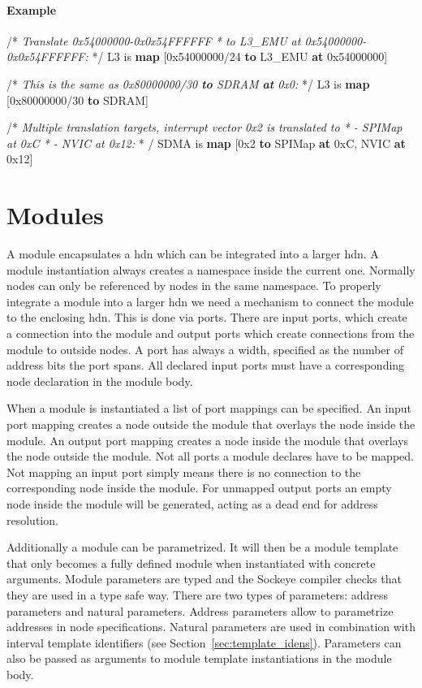 \documentclass[a4paper,11pt,twoside]{report}
\begin{document}
{{{\paragraph{Example}
\begin{example}
    /* \textit{Translate \textup{0x54000000-0x0x54FFFFFF}
     * to \textup{L3_EMU} at \textup{0x54000000-0x0x54FFFFFF}:}
     */
    L3 is \textbf{map} [0x54000000/24 \textbf{to} L3_EMU \textbf{at} 0x54000000] 

    /* \textit{This is the same as \textup{0x80000000/30 \textbf{to} SDRAM \textbf{at} 0x0}:} */
    L3 is \textbf{map} [0x80000000/30 \textbf{to} SDRAM]

    /* \textit{Multiple translation targets, interrupt vector \textup{0x2} is translated to
     * - \textup{SPIMap} at \textup{0xC}
     * - \textup{NVIC} at \textup{0x12}:}
     * /
    SDMA is \textbf{map} [0x2 \textbf{to} SPIMap \textbf{at} 0xC, NVIC \textbf{at} 0x12]
\end{example}

\section{Modules}
\label{sec:modules}
A module encapsulates a \gls{hdn} which can be integrated into a larger \gls{hdn}.
A module instantiation always creates a namespace inside the current one.
Normally nodes can only be referenced by nodes in the same namespace.
To properly integrate a module into a larger \gls{hdn} we need a mechanism to connect the module to the enclosing \gls{hdn}.
This is done via ports.
There are input ports, which create a connection into the module and output ports which create connections from the module to outside nodes.
A port has always a width, specified as the number of address bits the port spans.
All declared input ports must have a corresponding node declaration in the module body.

When a module is instantiated a list of port mappings can be specified.
An input port mapping creates a node outside the module that overlays the node inside the module.
An output port mapping creates a node inside the module that overlays the node outside the module.
Not all ports a module declares have to be mapped.
Not mapping an input port simply means there is no connection to the corresponding node inside the module.
For unmapped output ports an empty node inside the module will be generated, acting as a dead end for address resolution.

Additionally a module can be parametrized.
It will then be a module template that only becomes a fully defined module when instantiated with concrete arguments.
Module parameters are typed and the Sockeye compiler checks that they are used in a type safe way.
There are two types of parameters: address parameters and natural parameters.
Address parameters allow to parametrize addresses in node specifications.
Natural parameters are used in combination with interval template identifiers (see Section~\ref{sec:template_idens}).
Parameters can also be passed as arguments to module template instantiations in the module body.

}}}
\end{document}
